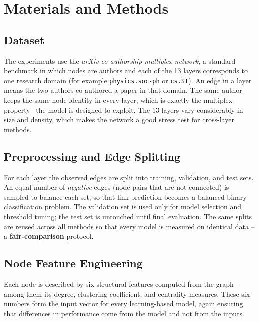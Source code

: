 \chapter{Materials and Methods}
\label{ch:methods}

\section{Dataset}
The experiments use the \emph{arXiv co-authorship multiplex network}, a standard benchmark in which
nodes are authors and each of the 13 layers corresponds to one research domain (for example
\texttt{physics.soc-ph} or \texttt{cs.SI}). An edge in a layer means the two authors co-authored a
paper in that domain. The same author keeps the same node identity in every layer, which is exactly
the multiplex property~\cite{kivela2014} the model is designed to exploit. The 13 layers vary
considerably in size and density, which makes the network a good stress test for cross-layer methods.

\section{Preprocessing and Edge Splitting}
For each layer the observed edges are split into training, validation, and test sets. An equal number
of \emph{negative} edges (node pairs that are not connected) is sampled to balance each set, so that
link prediction becomes a balanced binary classification problem. The validation set is used only for
model selection and threshold tuning; the test set is untouched until final evaluation. The same
splits are reused across all methods so that every model is measured on identical data -- a
\textbf{fair-comparison} protocol.

\section{Node Feature Engineering}
Each node is described by six structural features computed from the graph -- among them its degree,
clustering coefficient, and centrality measures. These six numbers form the input vector for every
learning-based model, again ensuring that differences in performance come from the model and not from
the inputs.


